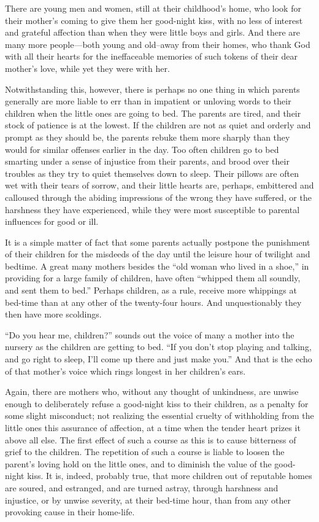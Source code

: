 \documentclass[
]{book}
\begin{document}
There are young men and women, still at their childhood's home, who look for their mother's coming to give them her good-night kiss, with no less of interest and grateful affection than when they were little boys and girls. And there are many more people---both young and old--away from their homes, who thank God with all their hearts for the ineffaceable memories of such tokens of their dear mother's love, while yet they were with her.

Notwithstanding this, however, there is perhaps no one thing in which parents generally are more liable to err than in impatient or unloving words to their children when the little ones are going to bed. The parents are tired, and their stock of patience is at the lowest. If the children are not as quiet and orderly and prompt as they should be, the parents rebuke them more sharply than they would for similar offenses earlier in the day. Too often children go to bed smarting under a sense of injustice from their parents, and brood over their troubles as they try to quiet themselves down to sleep. Their pillows are often wet with their tears of sorrow, and their little hearts are, perhaps, embittered and calloused through the abiding impressions of the wrong they have suffered, or the harshness they have experienced, while they were most susceptible to parental influences for good or ill.

It is a simple matter of fact that some parents actually postpone the punishment of their children for the misdeeds of the day until the leisure hour of twilight and bedtime. A great many mothers besides the ``old woman who lived in a shoe,'' in providing for a large family of children, have often ``whipped them all soundly, and sent them to bed.'' Perhaps children, as a rule, receive more whippings at bed-time than at any other of the twenty-four hours. And unquestionably they then have more scoldings.

``Do you hear me, children?'' sounds out the voice of many a mother into the nursery as the children are getting to bed. ``If you don't stop playing and talking, and go right to sleep, I'll come up there and just make you.'' And that is the echo of that mother's voice which rings longest in her children's ears.

Again, there are mothers who, without any thought of unkindness, are unwise enough to deliberately refuse a good-night kiss to their children, as a penalty for some slight misconduct; not realizing the essential cruelty of withholding from the little ones this assurance of affection, at a time when the tender heart prizes it above all else. The first effect of such a course as this is to cause bitterness of grief to the children. The repetition of such a course is liable to loosen the parent's loving hold on the little ones, and to diminish the value of the good-night kiss. It is, indeed, probably true, that more children out of reputable homes are soured, and estranged, and are turned astray, through harshness and injustice, or by unwise severity, at their bed-time hour, than from any other provoking cause in their home-life.
\end{document}
